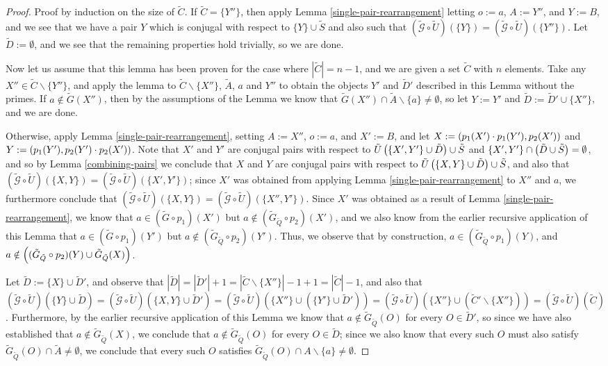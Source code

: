 \documentclass[twocolumn,showpacs,preprintnumbers,amsmath,amssymb,nofootinbib,pra,floatfix]{revtex4-1}
\newcommand{\set}{\tilde}
\newcommand{\genfun}{\tilde{\mathcal{G}}}
\begin{document}
\begin{proof}
Proof by induction on the size of $\set C$.  If $\set C=\{Y''\}$, then apply Lemma \ref{single-pair-rearrangement} letting $o:=a$, $A:=Y''$, and $Y:=B$, and we see that we have a pair $Y$ which is conjugal with respect to $\{Y\}\cup\set S$ and also such that $(\genfun\circ\set U)(\{Y\})=(\genfun\circ\set U)(\{Y''\})$.  Let $\set D:=\emptyset$, and we see that the remaining properties hold trivially, so we are done.

Now let us assume that this lemma has been proven for the case where $|\set C|=n-1$, and we are given a set $\set C$ with $n$ elements.  Take any $X''\in\set C\backslash\{Y''\}$, and apply the lemma to $\set C\backslash \{X''\}$, $\set A$, $a$ and $Y''$ to obtain the objects $Y'$ and $\set D'$ described in this Lemma without the primes.  If $a\notin\set G(X'')$, then by the assumptions of the Lemma we know that $\set G(X'') \cap \set A\backslash \{a\} \ne \emptyset$, so let $Y:=Y'$ and $\set D:=\set D'\cup\{X''\}$, and we are done.

Otherwise, apply Lemma \ref{single-pair-rearrangement}, setting $A:=X''$, $o:=a$, and $X':=B$, and let $X:=\left(p_1(X')\cdot p_1(Y'),p_2(X')\right)$ and $Y:=\left(p_1(Y'),p_2(Y')\cdot p_2(X')\right)$.  Note that $X'$ and $Y'$ are conjugal pairs with respect to $\set U\paren{\{X',Y'\}\cup\set D}\cup\set S$ and $\{X',Y'\}\cap \paren{\set D\cup\set S}=\emptyset$, and so by Lemma \ref{combining-pairs} we conclude that $X$ and $Y$ are conjugal pairs with respect to $\set U\paren{\{X,Y\}\cup\set D}\cup\set S$, and also that $(\genfun\circ\set U)(\{X,Y\})=(\genfun\circ\set U)(\{X',Y'\})$;  since $X'$ was obtained from applying Lemma \ref{single-pair-rearrangement} to $X''$ and $a$, we furthermore conclude that $(\genfun\circ\set U)(\{X,Y\})=(\genfun\circ\set U)(\{X'',Y'\})$.  Since $X'$ was obtained as a result of Lemma \ref{single-pair-rearrangement}, we know that $a\in (\set G \circ p_1)(X')$ but $a\notin (\set G_{\set Q} \circ p_2)(X')$, and we also know from the earlier recursive application of this Lemma that $a\in (\set G \circ p_1)(Y')$ but $a\notin (\set G_{\set Q} \circ p_2)(Y')$.  Thus, we observe that by construction, $a\in (\set G_{\set Q} \circ p_1)(Y)$, and $a\notin \paren{(\set G_{\set Q} \circ p_2)(Y) \cup \set G_{\set Q}(X)}$.

Let $\set D:=\{X\}\cup\set D'$, and observe that $|\set D|=|\set D'|+1=|\set C\backslash \{X''\}|-1+1=|\set C|-1$, and also that $(\genfun\circ\set U)(\{Y\}\cup\set D)=(\genfun\circ\set U)(\{X,Y\}\cup\set D')=(\genfun\circ\set U)(\{X''\}\cup(\{Y'\}\cup\set D'))=(\genfun\circ\set U)(\{X''\}\cup(\set C'\backslash\{X''\}))=(\genfun\circ\set U)(\set C)$.  Furthermore, by the earlier recursive application of this Lemma we know that $a\notin\set G_{\set Q}(O)$ for every $O\in \set D'$, so since we have also established that $a\notin \set G_{\set Q}(X)$, we conclude that $a\notin\set G_{\set Q}(O)$ for every $O\in \set D$;  since we also know that every such $O$ must also satisfy $\set G_{\set Q}(O)\cap \set A \ne \emptyset$, we conclude that every such $O$ satisfies $\set G_{\set Q}(O) \cap A\backslash\{a\}\ne\emptyset$.
\end{proof}
\end{document}
